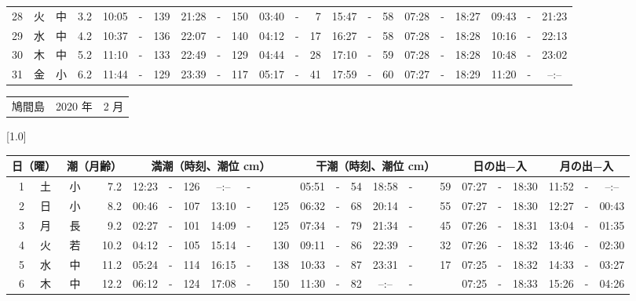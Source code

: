\documentclass[12pt,a4j]{jsarticle}
\begin{document}
\begin{table}[htbp]
\begin{center}
{\begin{tabular}{|rc|cr|ccrccr|ccrccr|ccc|ccc|}
28 & 火 & 中 &  3.2 &  10:05 &-& 139 &  21:28 &-& 150 &  03:40 &-&   7 &  15:47 &-&  58 & 07:28 & -& 18:27 & 09:43 & -& 21:23 \\
29 & 水 & 中 &  4.2 &  10:37 &-& 136 &  22:07 &-& 140 &  04:12 &-&  17 &  16:27 &-&  58 & 07:28 & -& 18:28 & 10:16 & -& 22:13 \\
30 & 木 & 中 &  5.2 &  11:10 &-& 133 &  22:49 &-& 129 &  04:44 &-&  28 &  17:10 &-&  59 & 07:28 & -& 18:28 & 10:48 & -& 23:02 \\
31 & 金 & 小 &  6.2 &  11:44 &-& 129 &  23:39 &-& 117 &  05:17 &-&  41 &  17:59 &-&  60 & 07:27 & -& 18:29 & 11:20 & -& --:-- \\
   \hline
   \end{tabular}}
   \end{center}
\end{table}
\newpage
 \begin{table}[htbp]
 \begin{center}
 \begin{tabular}{lcc}
 \LARGE{鳩間島}  & \large{2020 年} & \large{ 2 月} \\
 \end{tabular}
 \end{center}
 \begin{center}
    \scalebox{0.7}[1.0]{
    \begin{tabular}{|rc|cr|ccrccr|ccrccr|ccc|ccc|}
    \hline
    \multicolumn{2}{|c|}{日（曜）} & \multicolumn{2}{c|}{潮（月齢）} & \multicolumn{6}{c|}{満潮（時刻、潮位 cm）} & \multicolumn{6}{c|}{干潮（時刻、潮位 cm）} & \multicolumn{3}{c|}{日の出−入} &  \multicolumn{3}{c|}{月の出−入}\\
 \hline
 1 & 土 & 小 &  7.2 &  12:23 &-& 126 &  --:-- &-&~~~~~ &  05:51 &-&  54 &  18:58 &-&  59 & 07:27 & -& 18:30 & 11:52 & -& --:-- \\
 2 & 日 & 小 &  8.2 &  00:46 &-& 107 &  13:10 &-& 125 &  06:32 &-&  68 &  20:14 &-&  55 & 07:27 & -& 18:30 & 12:27 & -& 00:43 \\
 3 & 月 & 長 &  9.2 &  02:27 &-& 101 &  14:09 &-& 125 &  07:34 &-&  79 &  21:34 &-&  45 & 07:26 & -& 18:31 & 13:04 & -& 01:35 \\
 4 & 火 & 若 & 10.2 &  04:12 &-& 105 &  15:14 &-& 130 &  09:11 &-&  86 &  22:39 &-&  32 & 07:26 & -& 18:32 & 13:46 & -& 02:30 \\
 5 & 水 & 中 & 11.2 &  05:24 &-& 114 &  16:15 &-& 138 &  10:33 &-&  87 &  23:31 &-&  17 & 07:25 & -& 18:32 & 14:33 & -& 03:27 \\
 6 & 木 & 中 & 12.2 &  06:12 &-& 124 &  17:08 &-& 150 &  11:30 &-&  82 &  --:-- &-&~~~~~ & 07:25 & -& 18:33 & 15:26 & -& 04:26 \\

\end{tabular}}
\end{center}
\end{table}
\end{document}
